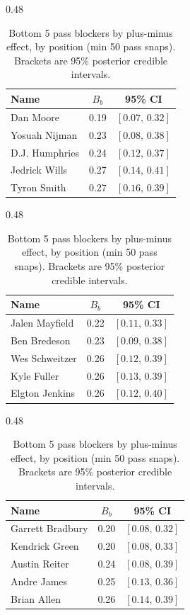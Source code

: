 \begin{table}[h!]
\centering
\begin{subtable}{0.48\textwidth}
\centering
\footnotesize
\begin{tabular}{lcc}
\toprule
Name & $B_b$ & 95\% CI \\
\midrule
Dan Moore & 0.19 & $[0.07,\,0.32]$ \\
Yosuah Nijman & 0.23 & $[0.08,\,0.38]$ \\
D.J. Humphries & 0.24 & $[0.12,\,0.37]$ \\
Jedrick Wills & 0.27 & $[0.14,\,0.41]$ \\
Tyron Smith & 0.27 & $[0.16,\,0.39]$ \\
\bottomrule
\end{tabular}
\caption{T}
\end{subtable}
\hfill
\begin{subtable}{0.48\textwidth}
\centering
\footnotesize
\begin{tabular}{lcc}
\toprule
Name & $B_b$ & 95\% CI \\
\midrule
Jalen Mayfield & 0.22 & $[0.11,\,0.33]$ \\
Ben Bredeson & 0.23 & $[0.09,\,0.38]$ \\
Wes Schweitzer & 0.26 & $[0.12,\,0.39]$ \\
Kyle Fuller & 0.26 & $[0.13,\,0.39]$ \\
Elgton Jenkins & 0.26 & $[0.12,\,0.40]$ \\
\bottomrule
\end{tabular}
\caption{G}
\end{subtable}

\bigskip
\begin{subtable}{0.48\textwidth}
\centering
\footnotesize
\begin{tabular}{lcc}
\toprule
Name & $B_b$ & 95\% CI \\
\midrule
Garrett Bradbury & 0.20 & $[0.08,\,0.32]$ \\
Kendrick Green & 0.20 & $[0.08,\,0.33]$ \\
Austin Reiter & 0.24 & $[0.08,\,0.39]$ \\
Andre James & 0.25 & $[0.13,\,0.36]$ \\
Brian Allen & 0.26 & $[0.14,\,0.39]$ \\
\bottomrule
\end{tabular}
\caption{C}
\end{subtable}
\caption{Bottom 5 pass blockers by plus-minus effect, by position (min 50 pass snaps). Brackets are 95\% posterior credible intervals.}
\label{tab:blocker_pm_bot}
\end{table}
